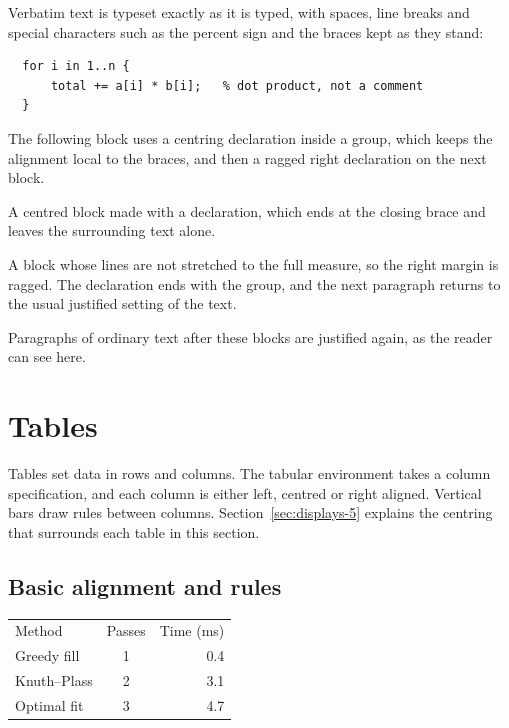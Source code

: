 \documentclass{article}
\begin{document}
Verbatim text is typeset exactly as it is typed, with spaces, line breaks and special
characters such as the percent sign and the braces kept as they stand:

\begin{verbatim}
  for i in 1..n {
      total += a[i] * b[i];   % dot product, not a comment
  }
\end{verbatim}

The following block uses a centring declaration inside a group, which keeps the
alignment local to the braces, and then a ragged right declaration on the next block.

{\centering A centred block made with a declaration, which ends at the closing
brace and leaves the surrounding text alone.\par}

{\raggedright A block whose lines are not stretched to the full measure, so the
right margin is ragged. The declaration ends with the group, and the next paragraph
returns to the usual justified setting of the text.\par}

Paragraphs of ordinary text after these blocks are justified again, as the reader can
see here.

\section{Tables}\label{sec:tables-5}

Tables set data in rows and columns. The tabular environment takes a column
specification, and each column is either left, centred or right aligned. Vertical bars
draw rules between columns. Section~\ref{sec:displays-5} explains the centring that surrounds each table in
this section.

\subsection{Basic alignment and rules}\label{sec:tables-basic-5}

\begin{center}
\begin{tabular}{l c r}
Method & Passes & Time (ms) \\
Greedy fill      & 1 & 0.4 \\
Knuth--Plass     & 2 & 3.1 \\
Optimal fit      & 3 & 4.7 \\
\end{tabular}
\end{center}
\end{document}
